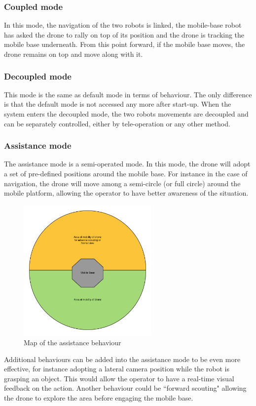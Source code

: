 \documentclass[11pt,a4paper]{article}
\begin{document}
\subsubsection{Coupled mode}
In this mode, the navigation of the two robots is linked, the mobile-base robot has asked the drone to 
rally on top of its position and the drone is tracking the mobile base underneath. From this point forward, if the mobile base moves, the drone remains on top and move along with it.

\subsubsection{Decoupled mode}
This mode is the same as default mode in terms of behaviour. The only difference is that the default mode
is not accessed any more after start-up. When the system enters the decoupled mode, the two robots movements
are decoupled and can be separately controlled, either by tele-operation or any other method.

\subsubsection{Assistance mode}
The assistance mode is a semi-operated mode. In this mode, the drone will adopt a set of pre-defined
positions around the mobile base. For instance in the case of navigation, the drone will move 
among a semi-circle (or full circle) around the mobile platform, allowing the 
operator to have better awareness of the situation.

\begin{figure}[ht]	
\centering
\includegraphics[height=7cm]{assistanceBehavior.png}
\caption{Map of the assistance behaviour}
\end{figure}

Additional behaviours can be added into the assistance mode to be even more effective, for
instance adopting a lateral camera position while the robot is grasping an object. This would
allow the operator to have a real-time visual feedback on the action. Another behaviour
could be ``forward scouting" allowing the drone to explore the area before engaging the 
mobile base.
\end{document}
